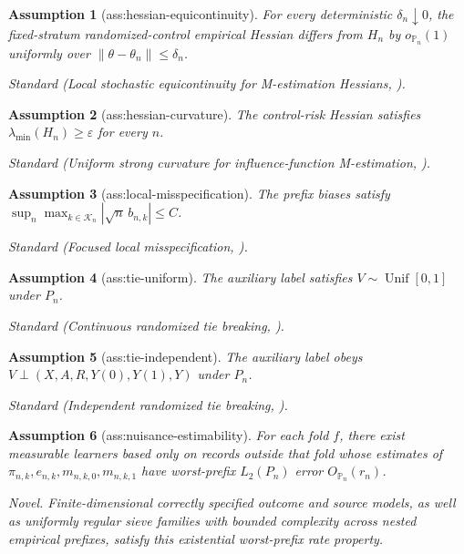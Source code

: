 \documentclass{article}
\newtheorem{assumption}{Assumption}
\begin{document}
\begin{assumption}[ass:hessian-equicontinuity]\label{ass:hessian-equicontinuity}
For every deterministic \(\delta_n\downarrow0\), the fixed-stratum randomized-control empirical Hessian differs from \(H_n\) by \(o_{\mathbb P_n}(1)\) uniformly over \(\|\theta-\theta_n\|\le\delta_n\).
\par\smallskip\noindent\emph{Standard} (Local stochastic equicontinuity for M-estimation Hessians, \cite{YangLiWuYang2026}).
\end{assumption}

\begin{assumption}[ass:hessian-curvature]\label{ass:hessian-curvature}
The control-risk Hessian satisfies \(\lambda_{\min}(H_n)\ge\varepsilon\) for every \(n\).
\par\smallskip\noindent\emph{Standard} (Uniform strong curvature for influence-function M-estimation, \cite{YangLiWuYang2026}).
\end{assumption}

\begin{assumption}[ass:local-misspecification]\label{ass:local-misspecification}
The prefix biases satisfy \(\sup_n\max_{k\in\mathcal K_n}|\sqrt n\,b_{n,k}|\le C\).
\par\smallskip\noindent\emph{Standard} (Focused local misspecification, \cite{ClaeskensHjort2003}).
\end{assumption}

\begin{assumption}[ass:tie-uniform]\label{ass:tie-uniform}
The auxiliary label satisfies \(V\sim\operatorname{Unif}[0,1]\) under \(P_n\).
\par\smallskip\noindent\emph{Standard} (Continuous randomized tie breaking, \cite{MogstadRomanoShaikhWilhelm2024}).
\end{assumption}

\begin{assumption}[ass:tie-independent]\label{ass:tie-independent}
The auxiliary label obeys \(V\perp(X,A,R,Y(0),Y(1),Y)\) under \(P_n\).
\par\smallskip\noindent\emph{Standard} (Independent randomized tie breaking, \cite{MogstadRomanoShaikhWilhelm2024}).
\end{assumption}

\begin{assumption}[ass:nuisance-estimability]\label{ass:nuisance-estimability}
For each fold \(f\), there exist measurable learners based only on records outside that fold whose estimates of \(\pi_{n,k},e_{n,k},m_{n,k,0},m_{n,k,1}\) have worst-prefix \(L_2(P_n)\) error \(O_{\mathbb P_n}(r_n)\).
\par\smallskip\noindent\emph{Novel.} Finite-dimensional correctly specified outcome and source models, as well as uniformly regular sieve families with bounded complexity across nested empirical prefixes, satisfy this existential worst-prefix rate property.
\end{assumption}
\end{document}
